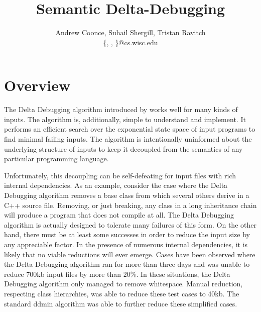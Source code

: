 \documentclass[11pt]{article}
\title{Semantic Delta-Debugging}
\author{Andrew Coonce, Suhail Shergill, Tristan Ravitch \\
\{\mailto{coonce}, \mailto{shergill}, \mailto{travitch}\}@cs.wisc.edu
}
\begin{document}
\maketitle

\section{Overview}
The Delta Debugging algorithm introduced by \citet{dd} works well
for many kinds of inputs. The algorithm is, additionally, simple to understand
and implement. It performs an efficient search over the exponential state space
of input programs to find minimal failing inputs. The algorithm is intentionally
uninformed about the underlying structure of inputs to keep it decoupled from
the semantics of any particular programming language.

Unfortunately, this decoupling can be self-defeating for input files with rich
internal dependencies. As an example, consider the case where the Delta
Debugging algorithm removes a base class from which several others derive in a
C++ source file. Removing, or just breaking, any class in a long inheritance
chain will produce a program that does not compile at all. The Delta Debugging
algorithm is actually designed to tolerate many failures of this form. On the
other hand, there must be at least some successes in order to reduce the input
size by any appreciable factor. In the presence of numerous internal
dependencies, it is likely that no viable reductions will ever emerge. Cases
have been observed \citep{trex} where the Delta Debugging algorithm ran for more than three
days and was unable to reduce 700kb input files by more than $20 \%$. In these
situations, the Delta Debugging algorithm only managed to remove whitespace.
Manual reduction, respecting class hierarchies, was able to reduce these
test cases to 40kb.  The standard ddmin algorithm was able to further reduce
these simplified cases.
\end{document}
